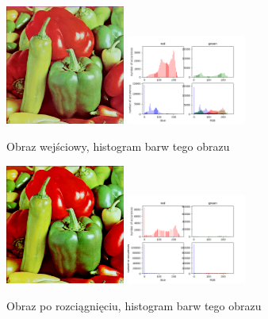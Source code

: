 \documentclass[final,a4paper,openany,12pt]{mwbk}
\begin{document}
\begin{figure}[H]
	\begin{center}
		\includegraphics[width=0.35\textwidth]{peppers_color}
		\includegraphics[width=0.35\textwidth]{peppers_color_histogram}
	\end{center}
	\caption{Obraz wejściowy, histogram barw tego obrazu}
\end{figure}

\begin{figure}[H]
	\begin{center}
		\includegraphics[width=0.35\textwidth]{peppers_color_stretchHist_result}
		\includegraphics[width=0.35\textwidth]{peppers_color_stretchHist_histogram}
	\end{center}
	\caption{Obraz po rozciągnięciu, histogram barw tego obrazu}
\end{figure}
\end{document}
